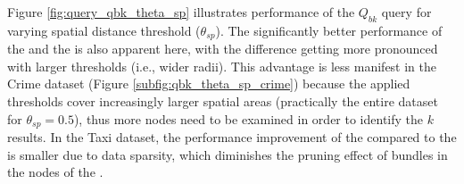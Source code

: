 Figure \ref{fig:query_qbk_theta_sp} illustrates performance of the $Q_{bk}$ query for varying spatial distance threshold ($\theta_{sp}$). The significantly better performance of the \tsr and the \btsr is also apparent here, with the difference getting more pronounced with larger thresholds (i.e., wider radii). This advantage is less manifest in the Crime dataset (Figure \ref{subfig:qbk_theta_sp_crime}) because the applied thresholds cover increasingly larger spatial areas (practically the entire dataset for $\theta_{sp} =0.5$), thus more nodes need to be examined in order to identify the $k$ results. In the Taxi dataset, the performance improvement of the \btsr compared to the \tsr is smaller due to data sparsity, which diminishes the pruning effect of bundles in the nodes of the \btsr.

\begin{figure}[!tb]
	\centering
	 \\

\end{figure}
